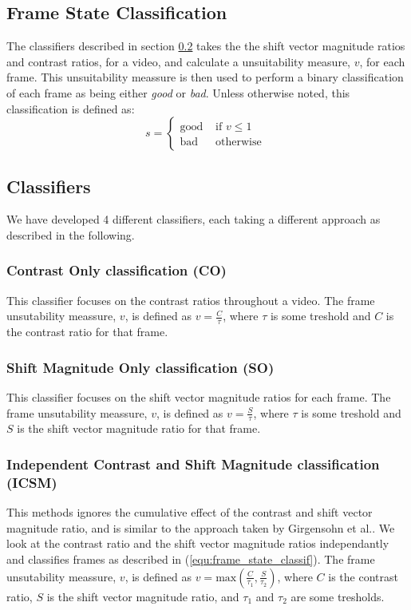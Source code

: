 \subsection{Frame State Classification}
%
The classifiers described in section \ref{sec:algorithms} takes the the shift vector magnitude ratios and contrast ratios, for a video, and calculate a unsuitability measure, $v$, for each frame. This unsuitability meassure is then used to perform a binary classification of each frame as being either \textit{good} or \textit{bad}. Unless otherwise noted, this classification is defined as:
\begin{equation}
s = 
\begin{cases}
\text{good} & \text{ if } v \leq 1\\
\text{bad} & \text{ otherwise }
\end{cases}
\end{equation}\label{equ:frame_state_classif}
%
\subsection{Classifiers}\label{sec:algorithms}
%
We have developed 4 different classifiers, each taking a different approach as described in the following.
%
\subsubsection{Contrast Only classification (CO)}
%
This classifier focuses on the contrast ratios throughout a video. The frame unsutability meassure, $v$, is defined as $v=\frac{C}{\tau}$, where $\tau$ is some treshold and $C$ is the contrast ratio for that frame.
%
\subsubsection{Shift Magnitude Only classification (SO)}
%
This classifier focuses on the shift vector magnitude ratios for each frame. The frame unsutability meassure, $v$, is defined as $v=\frac{S}{\tau}$, where $\tau$ is some treshold and $S$ is the shift vector magnitude ratio for that frame.
%
\subsubsection{Independent Contrast and Shift Magnitude classification (ICSM)}
%
This methods ignores the cumulative effect of the contrast and shift vector magnitude ratio, and is similar to the approach taken by Girgensohn et al.\cite{Girgensohn:2000:SAH:354401.354415}. We look at the contrast ratio and the shift vector magnitude ratios independantly and classifies frames as described in (\ref{equ:frame_state_classif}). The frame unsutability meassure, $v$, is defined as $v=\text{max}(\frac{C}{\tau_1}, \frac{S}{\tau_2})$, where $C$ is the contrast ratio, $S$ is the shift vector magnitude ratio, and $\tau_1$ and $\tau_2$ are some tresholds.
%
